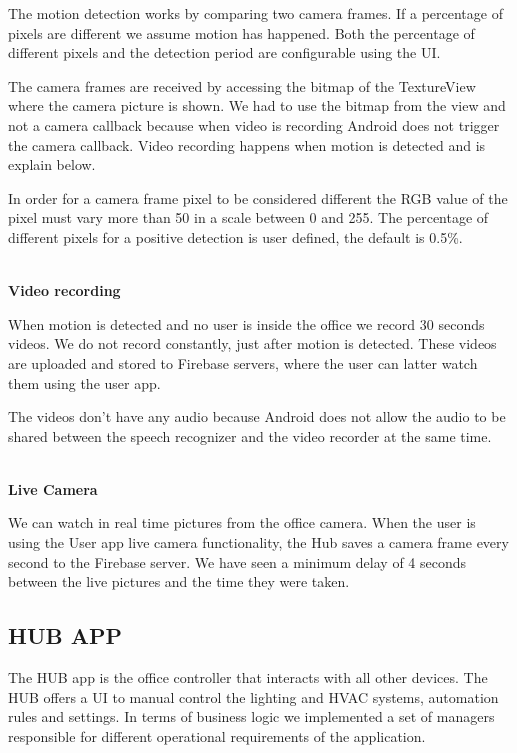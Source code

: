 The motion detection works by comparing two camera frames. If a percentage of pixels are different we assume motion has happened. Both the percentage of different pixels and the detection period are configurable using the \ac{UI}.

The camera frames are received by accessing the bitmap of the TextureView where the camera picture is shown. We had to use the bitmap from the view and not a camera callback because when video is recording Android does not trigger the camera callback. Video recording happens when motion is detected and is explain below.

In order for a camera frame pixel to be considered different the RGB value of the pixel must vary more than 50 in a scale between 0 and 255. The percentage of different pixels for a positive detection is user defined, the default is 0.5\%.


\mbox{}\\
\textbf{Video recording}

When motion is detected and no user is inside the office we record 30 seconds videos. We do not record constantly, just after motion is detected. These videos are uploaded and stored to Firebase servers, where the user can latter watch them using the user app.

The videos don't have any audio because Android does not allow the audio to be shared between the speech recognizer and the video recorder at the same time.


\mbox{}\\
\textbf{Live Camera}

We can watch in real time pictures from the office camera. When the user is using the User app live camera functionality, the Hub saves a camera frame every second to the Firebase server. We have seen a minimum delay of 4 seconds between the live pictures and the time they were taken.


\subsection{HUB APP}



The HUB app is the office controller that interacts with all other devices. The HUB offers a \ac{UI} to manual control the lighting and \ac{HVAC} systems, automation rules and settings. In terms of business logic we implemented a set of managers responsible for different operational requirements of the application.


